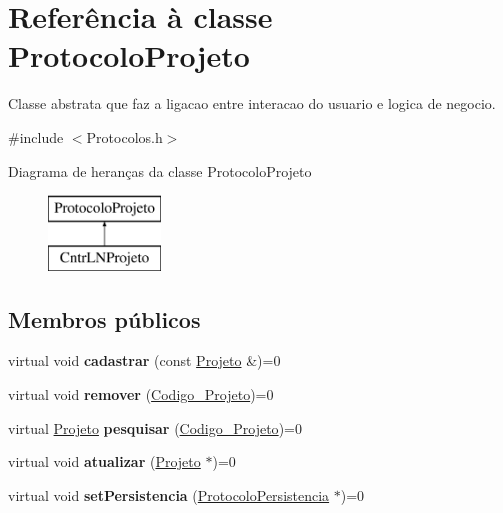 \hypertarget{class_protocolo_projeto}{
\section{\-Referência à classe \-Protocolo\-Projeto}
\label{class_protocolo_projeto}
}


\-Classe abstrata que faz a ligacao entre interacao do usuario e logica de negocio.  




{\ttfamily \#include $<$\-Protocolos.\-h$>$}

\-Diagrama de heranças da classe \-Protocolo\-Projeto\begin{figure}[H]
\begin{center}
\leavevmode
\includegraphics[height=2.000000cm]{class_protocolo_projeto}
\end{center}
\end{figure}
\subsection*{\-Membros públicos}
\begin{DoxyCompactItemize}
\item 
\hypertarget{class_protocolo_projeto_a9f40bae886ad64945119c11e84b2f0d5}{
virtual void {\bfseries cadastrar} (const \hyperlink{class_projeto}{\-Projeto} \&)=0}
\label{class_protocolo_projeto_a9f40bae886ad64945119c11e84b2f0d5}

\item 
\hypertarget{class_protocolo_projeto_a083c4caec4591d509e141e97d698aa2d}{
virtual void {\bfseries remover} (\hyperlink{class_codigo___projeto}{\-Codigo\-\_\-\-Projeto})=0}
\label{class_protocolo_projeto_a083c4caec4591d509e141e97d698aa2d}

\item 
\hypertarget{class_protocolo_projeto_a01c7c0f083c533c197b7c4e69f56ed59}{
virtual \hyperlink{class_projeto}{\-Projeto} {\bfseries pesquisar} (\hyperlink{class_codigo___projeto}{\-Codigo\-\_\-\-Projeto})=0}
\label{class_protocolo_projeto_a01c7c0f083c533c197b7c4e69f56ed59}

\item 
\hypertarget{class_protocolo_projeto_a8aff82adca2349e06fe963c558a586c7}{
virtual void {\bfseries atualizar} (\hyperlink{class_projeto}{\-Projeto} $\ast$)=0}
\label{class_protocolo_projeto_a8aff82adca2349e06fe963c558a586c7}

\item 
\hypertarget{class_protocolo_projeto_a3fcb3551c4cf44438865079015043089}{
virtual void {\bfseries set\-Persistencia} (\hyperlink{class_protocolo_persistencia}{\-Protocolo\-Persistencia} $\ast$)=0}
\label{class_protocolo_projeto_a3fcb3551c4cf44438865079015043089}

\end{DoxyCompactItemize}


